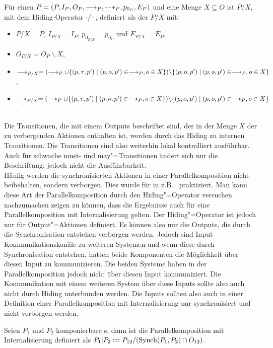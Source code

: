 \begin{Def}
  \label{HidingDef}
  Für einen \MEIO{} $P = (P,I_P,O_P,\must _P, \may _P,\linebreak p_{0_P},
  E_P)$ und eine Menge $X\subseteq O$ ist $P/X$, mit dem Hiding-Operator $\cdot
  /\cdot$, definiert als der \MEIO{} $P/X$ mit: 
  \begin{itemize}
    \item $P/X = P$, $I_{P/X} = I_P$, $p_{0_{P/X}} = p_{0_P}$ und $E_{P/X} =
      E_P$,
    \item $O_{P/X} = O_P\backslash X$,
    \item $\must _{P/X} = (\must _P \cup \{(p,\tau,p')\mid (p,o,p')\in \must
      _P, o \in X\})\backslash \{(p,o,p')\mid (p,o,p')\in \must _P,\linebreak o
      \in X\}$, 
    \item $\may _{P/X} = (\may _P \cup \{(p,\tau,p')\mid (p,o,p')\in \may _P, o
      \in X\})\backslash \{(p,o,p')\mid (p,o,p')\in \may _P,\linebreak o \in
      X\}$. 
  \end{itemize}
\end{Def}

Die Transitionen, die mit einem Outputs beschriftet sind, der in der Menge $X$
der zu verbergenden Aktionen enthalten ist, werden durch das Hiding zu internen
Transitionen. Die Transitionen sind also weiterhin lokal kontrolliert
ausführbar. Auch für schwache must- und may"=Transitionen ändert sich nur die
Beschriftung, jedoch nicht die Ausführbarkeit.\\
Häufig werden die synchronisierten Aktionen in einer Parallelkomposition nicht
beibehalten, sondern verborgen. Dies wurde für \EIO{} in
z.B.~\cite{Vogler2014EIO} praktiziert. Man kann diese Art der
Parallelkomposition durch den Hiding"=Operator versuchen nachzumachen zeigen zu
können, dass die Ergebnisse auch für eine Parallelkomposition mit
Internalisierung gelten. Der Hiding"=Operator ist jedoch nur für
Output"=Aktionen definiert. Es können also nur die Outputs, die durch die
Synchronisation entstehen verborgen werden. Jedoch sind Input
Kommunikationskanäle zu weiteren Systemen und wenn diese durch Synchronisation
entstehen, hatten beide Komponenten die Möglichkeit über diesen Input zu
kommunizieren. Die beiden Systeme haben in der Parallelkomposition jedoch nicht
über diesen Input kommuniziert. Die Kommunikation mit einem weiteren System
über diese Inputs sollte also auch nicht durch Hiding unterbunden werden. Die
Inputs sollten also auch in einer Definition einer Parallelkomposition mit
Internalisierung nur synchronisiert und nicht verborgen werden.

\begin{Def}
  \label{DefParallelkompInternal}
  Seien $P_1$ und $P_2$ komponierbare \MEIO{}s, dann ist die
  Parallelkomposition mit Internalisierung definiert als $P_1|P_2 :=
  P_{12}/(\mathrm{Synch} (P_1,P_2)\cap O_{12})$.
\end{Def}

